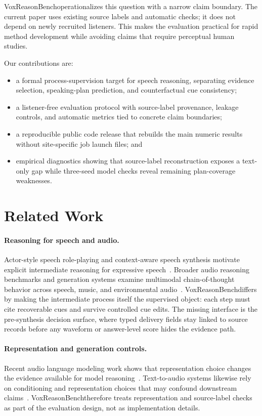 \documentclass{article}
\newcommand{\method}{VoxReasonBench}
\begin{document}
\method operationalizes this question with a narrow claim boundary. The current paper uses existing source labels and automatic checks; it does not depend on newly recruited listeners. This makes the evaluation practical for rapid method development while avoiding claims that require perceptual human studies.

Our contributions are:
\begin{itemize}
    \item a formal process-supervision target for speech reasoning, separating evidence selection, speaking-plan prediction, and counterfactual cue consistency;
    \item a listener-free evaluation protocol with source-label provenance, leakage controls, and automatic metrics tied to concrete claim boundaries;
    \item a reproducible public code release that rebuilds the main numeric results without site-specific job launch files; and
    \item empirical diagnostics showing that source-label reconstruction exposes a text-only gap while three-seed model checks reveal remaining plan-coverage weaknesses.
\end{itemize}

\section{Related Work}
\paragraph{Reasoning for speech and audio.}
Actor-style speech role-playing and context-aware speech synthesis motivate explicit intermediate reasoning for expressive speech~\citep{actormind2026,cottts2026}. Broader audio reasoning benchmarks and generation systems examine multimodal chain-of-thought behavior across speech, music, and environmental audio~\citep{mmar2025,thinksound2025,prismaudio2026}. \method differs by making the intermediate process itself the supervised object: each step must cite recoverable cues and survive controlled cue edits. The missing interface is the pre-synthesis decision surface, where typed delivery fields stay linked to source records before any waveform or answer-level score hides the evidence path.

\paragraph{Representation and generation controls.}
Recent audio language modeling work shows that representation choice changes the evidence available for model reasoning~\citep{speechrepresentation2026,codecdoesmatter2025,llaseg12025}. Text-to-audio systems likewise rely on conditioning and representation choices that may confound downstream claims~\citep{audiox2026,spatialaudio2025,sparktts2025}. \method therefore treats representation and source-label checks as part of the evaluation design, not as implementation details.
\end{document}

